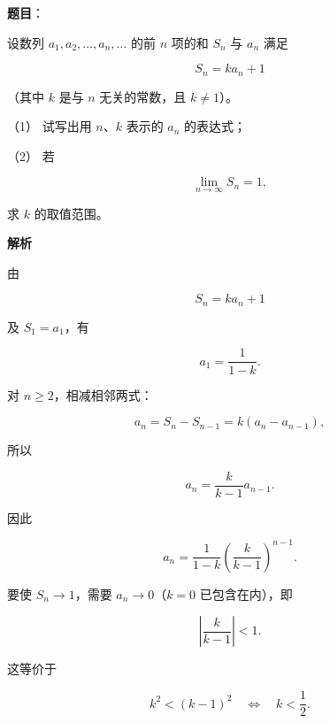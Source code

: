 \begin{answer}

\textbf{题目}：

设数列 $a_1,a_2,\ldots,a_n,\ldots$ 的前 $n$ 项的和 $S_n$ 与 $a_n$ 满足

\nopagebreak[4]
\[
S_n=ka_n+1
\]

（其中 $k$ 是与 $n$ 无关的常数，且 $k\ne1$）。

（1） 试写出用 $n\text{、}k$ 表示的 $a_n$ 的表达式；

（2） 若

\nopagebreak[4]
\[
\lim_{n\to\infty}S_n=1,
\]

求 $k$ 的取值范围。

\textbf{解析}


由

\nopagebreak[4]
\[
S_n=ka_n+1
\]

及 $S_1=a_1$，有

\nopagebreak[4]
\[
a_1=\frac1{1-k}.
\]

对 $n\ge2$，相减相邻两式：

\nopagebreak[4]
\[
a_n=S_n-S_{n-1}
=k(a_n-a_{n-1}),
\]

所以

\nopagebreak[4]
\[
a_n=\frac{k}{k-1}a_{n-1}.
\]

因此

\nopagebreak[4]
\[
a_n=\frac1{1-k}\left(\frac{k}{k-1}\right)^{n-1}.
\]


要使 $S_n\to1$，需要 $a_n\to0$（$k=0$ 已包含在内），即

\nopagebreak[4]
\[
\left|\frac{k}{k-1}\right|<1.
\]

这等价于

\nopagebreak[4]
\[
k^2<(k-1)^2
\quad\Longleftrightarrow\quad
k<\frac12.
\]



\end{answer}
